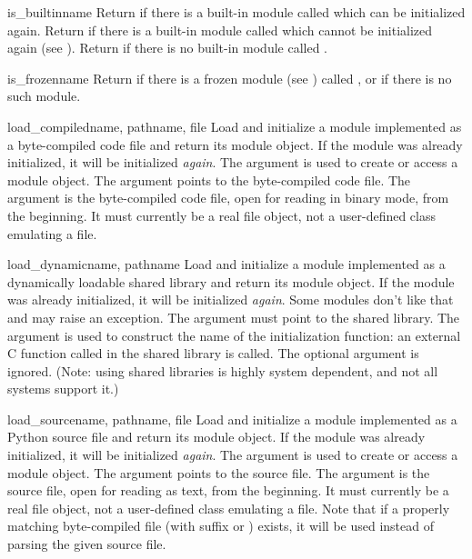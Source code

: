 \begin{funcdesc}{is_builtin}{name}
Return  if there is a built-in module called  which
can be initialized again.  Return  if there is a built-in
module called  which cannot be initialized again (see
).  Return  if there is no built-in
module called .
\end{funcdesc}

\begin{funcdesc}{is_frozen}{name}
Return  if there is a frozen module (see
) called , or  if there is
no such module.
\end{funcdesc}

\begin{funcdesc}{load_compiled}{name, pathname, file}
Load and initialize a module implemented as a byte-compiled code file
and return its module object.  If the module was already initialized,
it will be initialized \emph{again}.  The  argument is used
to create or access a module object.  The  argument
points to the byte-compiled code file.  The 
argument is the byte-compiled code file, open for reading in binary
mode, from the beginning.
It must currently be a real file object, not a
user-defined class emulating a file.
\end{funcdesc}

\begin{funcdesc}{load_dynamic}{name, pathname}
Load and initialize a module implemented as a dynamically loadable
shared library and return its module object.  If the module was
already initialized, it will be initialized \emph{again}.  Some modules
don't like that and may raise an exception.  The 
argument must point to the shared library.  The  argument is
used to construct the name of the initialization function: an external
C function called  in the shared library is
called.  The optional  argument is ignored.  (Note: using
shared libraries is highly system dependent, and not all systems
support it.)
\end{funcdesc}

\begin{funcdesc}{load_source}{name, pathname, file}
Load and initialize a module implemented as a Python source file and
return its module object.  If the module was already initialized, it
will be initialized \emph{again}.  The  argument is used to
create or access a module object.  The  argument points
to the source file.  The  argument is the source
file, open for reading as text, from the beginning.
It must currently be a real file
object, not a user-defined class emulating a file.  Note that if a
properly matching byte-compiled file (with suffix  or
) exists, it will be used instead of parsing the given
source file.
\end{funcdesc}


